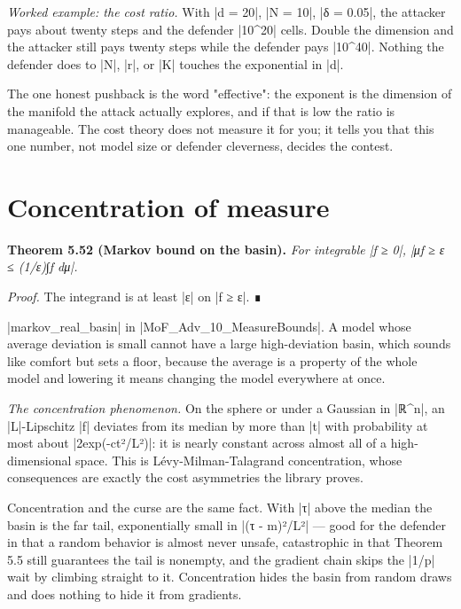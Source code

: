 \documentclass{memoir}
\begin{document}
\emph{Worked example: the cost ratio.} With \LeanVerb|d = 20|, \LeanVerb|N = 10|, \LeanVerb|δ = 0.05|, the
attacker pays about twenty steps and the defender \LeanVerb|10^20| cells. Double the
dimension and the attacker still pays twenty steps while the defender pays
\LeanVerb|10^40|. Nothing the defender does to \LeanVerb|N|, \LeanVerb|r|, or \LeanVerb|K| touches the exponential
in \LeanVerb|d|.

The one honest pushback is the word "effective": the exponent is the dimension
of the manifold the attack actually explores, and if that is low the ratio is
manageable. The cost theory does not measure it for you; it tells you that this
one number, not model size or defender cleverness, decides the contest.



\section{Concentration of measure}\label{Two--Schemas--of--Impossibility-005F-005F-005F--Machine--Checked--Limits--of--Trustworthy--Machine--Learning-005F-005F-005F--and--Why--They--Tighten--with--Capability----The--Geometry--of--Attacks----Concentration--of--measure}

\textbf{Theorem 5.52 (Markov bound on the basin).} \emph{For integrable \LeanVerb|f ≥ 0|,
\LeanVerb|μf ≥ ε ≤ (1/ε)∫f dμ|.}

\emph{Proof.} The integrand is at least \LeanVerb|ε| on \LeanVerb|f ≥ ε|. ∎

\LeanVerb|markov_real_basin| in \LeanVerb|MoF_Adv_10_MeasureBounds|. A model whose average
deviation is small cannot have a large high-deviation basin, which sounds like
comfort but sets a floor, because the average is a property of the whole model
and lowering it means changing the model everywhere at once.

\emph{The concentration phenomenon.} On the sphere or under a Gaussian in \LeanVerb|ℝ^n|, an
\LeanVerb|L|-Lipschitz \LeanVerb|f| deviates from its median by more than \LeanVerb|t| with probability at
most about \LeanVerb|2exp(-ct²/L²)|: it is nearly constant across almost all of a
high-dimensional space. This is Lévy-Milman-Talagrand concentration, whose
consequences are exactly the cost asymmetries the library proves.

Concentration and the curse are the same fact. With \LeanVerb|τ| above the median the
basin is the far tail, exponentially small in \LeanVerb|(τ - m)²/L²| — good for the
defender in that a random behavior is almost never unsafe, catastrophic in that
Theorem 5.5 still guarantees the tail is nonempty, and the gradient chain skips
the \LeanVerb|1/p| wait by climbing straight to it. Concentration hides the basin from
random draws and does nothing to hide it from gradients.
\end{document}
